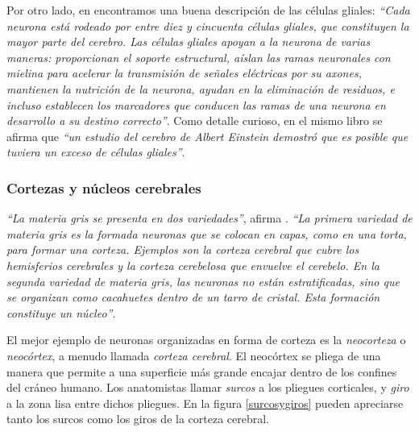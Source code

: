 Por otro lado, en \cite{Czerner2001} encontramos una buena descripción de las células gliales: {\it ``Cada neurona está rodeado por entre diez y cincuenta células gliales, que constituyen la mayor parte del cerebro. Las células gliales apoyan a la neurona de varias maneras: proporcionan el soporte estructural, aíslan las ramas neuronales con mielina para acelerar la transmisión de señales eléctricas por su axones, mantienen la nutrición de la neurona, ayudan en la eliminación de residuos, e incluso establecen los marcadores que conducen las ramas de una neurona en desarrollo a su destino correcto''}. Como detalle curioso, en el mismo libro se afirma que {\it ``un estudio del cerebro de Albert Einstein demostró que es posible que tuviera un exceso de células gliales''}.

\subsubsection{Cortezas y núcleos cerebrales}

{\it ``La materia gris se presenta en dos variedades''}, afirma \cite{Damasio1994}. {\it ``La primera variedad de materia gris es la formada neuronas que se colocan en capas, como en una torta, para formar una corteza. Ejemplos son la corteza cerebral que cubre los hemisferios cerebrales y la corteza cerebelosa que envuelve el cerebelo. En la segunda variedad de materia gris, las neuronas no están estratificadas, sino que se organizan como cacahuetes dentro de un tarro de cristal. Esta formación constituye un núcleo''}.


El mejor ejemplo de neuronas organizadas en forma de corteza es la {\it neocorteza} o {\it neocórtex}, a menudo llamada {\it corteza cerebral}. El neocórtex se pliega de una manera que permite a una superficie más grande encajar dentro de los confines del cráneo humano. Los anatomistas llamar {\it surcos} a los pliegues corticales, y {\it giro} a la zona lisa entre dichos pliegues. En la figura \ref{surcosygiros} pueden apreciarse tanto los surcos como los giros de la corteza cerebral.

